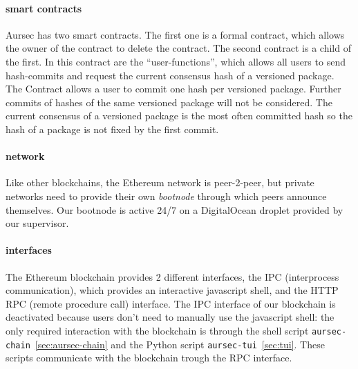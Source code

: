 \paragraph*{smart contracts} 
Aursec has two smart contracts. The first one is a formal contract, which allows the owner of the contract to delete the contract. The second contract is a child of the first. In this contract are the ``user-functions'', which allows all users to send hash-commits and request the current consensus hash of a versioned package. The Contract allows a user to commit one hash per versioned package. Further commits of hashes of the same versioned package will not be considered. The current consensus of a versioned package is the most often committed hash so the hash of a package is not fixed by the first commit.  

\paragraph*{network}
Like other blockchains, the Ethereum network is peer-2-peer, but private networks need to provide their own \emph{bootnode} through which peers announce themselves. Our bootnode is active 24/7 on a DigitalOcean droplet provided by our supervisor.

\paragraph*{interfaces}
The Ethereum blockchain provides 2 different interfaces, the IPC (interprocess communication), which provides an interactive javascript shell, and the HTTP RPC (remote procedure call) interface. The IPC interface of our blockchain is deactivated because users don't need to manually use the javascript shell: the only required interaction with the blockchain is through the shell script \texttt{aursec-chain}~\ref{sec:aursec-chain} and the Python script \texttt{aursec-tui}~\ref{sec:tui}. These scripts communicate with the blockchain trough the RPC interface.